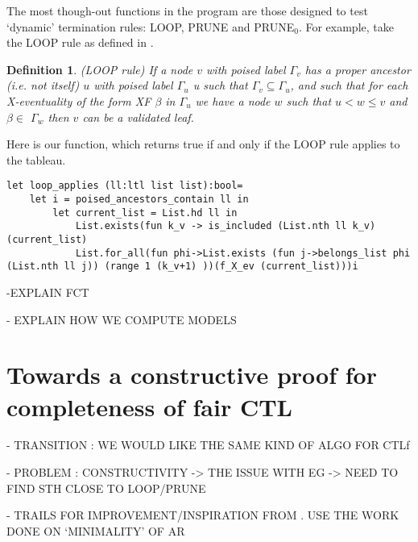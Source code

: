 \documentclass[11pt]{article}
\newtheorem*{definition}{Definition}
\begin{document}
The most though-out functions in the program are those designed to test `dynamic'
termination rules: LOOP, PRUNE and PRUNE$_0$. For example, take the LOOP rule as defined in 
\cite{ReyLTL}. 
\begin{definition}
    \emph{(LOOP rule)}
    If a node $v$ with poised label $\Gamma_v$ has a proper ancestor (i.e. not itself) $u$ with
poised label $\Gamma_u$ u such that $\Gamma_v \subseteq \Gamma_u$, and such that for each X-eventuality of the form XF $\beta$ in $\Gamma_u$ we
have a node $w$ such that $u < w \leq v $ and $\beta \in$ $\Gamma_w$ then $v$ can be a validated leaf.
\end{definition}
Here is our function, which returns true if and only if the LOOP rule
applies to the tableau.
\begin{lstlisting}
let loop_applies (ll:ltl list list):bool=
    let i = poised_ancestors_contain ll in
        let current_list = List.hd ll in
            List.exists(fun k_v -> is_included (List.nth ll k_v)(current_list) 
            List.for_all(fun phi->List.exists (fun j->belongs_list phi (List.nth ll j)) (range 1 (k_v+1) ))(f_X_ev (current_list)))i
\end{lstlisting}

-EXPLAIN FCT

- EXPLAIN HOW WE COMPUTE MODELS


\section{Towards a constructive proof for completeness of fair CTL}

- TRANSITION : WE WOULD LIKE THE SAME KIND OF ALGO FOR CTLf

- PROBLEM : CONSTRUCTIVITY -> THE ISSUE WITH EG -> NEED TO FIND STH CLOSE TO LOOP/PRUNE

- TRAILS FOR IMPROVEMENT/INSPIRATION FROM \cite{GhivG16}. USE THE WORK DONE ON `MINIMALITY' OF AR




\end{document}

